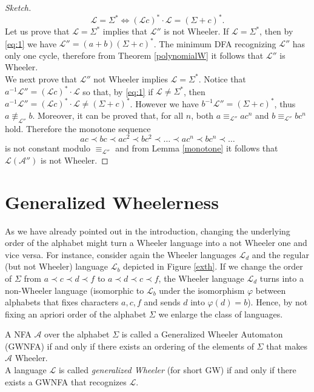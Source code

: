 \documentclass[runningheads]{llncs}
\newcommand{\la}[1]{\mathcal L(\mathcal #1)}
\begin{document}
\begin{proof}[Sketch]
\begin{equation}
\label{eq:1}
\mathcal L = \Sigma^* \iff (\mathcal Lc)^*\cdot\mathcal L = (\Sigma+c)^*.
\end{equation}
Let us prove that $\mathcal L = \Sigma^*$ implies that $\mathcal L''$ is not Wheeler. If $\mathcal L = \Sigma^*$, then by \eqref{eq:1} we have $\mathcal L'' = (a+b)(\Sigma+c)^*$. The minimum DFA recognizing $\mathcal L''$ has only one cycle, therefore from Theorem \ref{polynomialW} it follows that $\mathcal L''$ is Wheeler.\\
We next prove that $\mathcal L''$ not Wheeler implies $\mathcal L=\Sigma^*$. Notice that $a^{-1}\mathcal L''=(\mathcal Lc)^*\cdot\mathcal L $ so that,  by \eqref{eq:1}
if  $\mathcal L \ne \Sigma^*$, then $a^{-1}\mathcal L''=(\mathcal Lc)^*\cdot\mathcal L \ne (\Sigma+c)^*$. However we have $b^{-1}\mathcal L'' = (\Sigma+c)^*$, thus $a \not\equiv_\mathcal{L''} b$. Moreover, it can be proved that, for all $n$, both $a \equiv_\mathcal{L''} ac^n$ and $b \equiv_\mathcal{L''} bc^n$ hold. Therefore the monotone sequence 
\[
ac \prec bc \prec ac^2 \prec bc^2 \prec \dots \prec ac^n \prec bc^n \prec \dots
\]
is not constant modulo $\equiv_\mathcal{L''}$ and from Lemma \ref{monotone} it follows that $\la{A''}$ is not Wheeler.
\end{proof}


\section{Generalized Wheelerness}
\label{secGW}

As we have already pointed out in the introduction, changing the underlying order of the alphabet might turn a Wheeler language into a not Wheeler one and vice versa. For instance, consider again the Wheeler languages $\mathcal L_d$ and the regular (but not Wheeler) language $\mathcal L_b$ depicted in Figure \ref{exth}. 
If we change the order of $\Sigma$ from $a \prec c \prec d \prec f$ to $a \prec d \prec c \prec f$, the Wheeler language $\mathcal L_d$ turns into a non-Wheeler language (isomorphic to $\mathcal L_b$ under the isomorphism $\varphi$ between alphabets that fixes characters $a,c,f$ and sends $d$ into $\varphi(d) = b$). Hence, by not fixing  an apriori order of the alphabet $\Sigma$ we enlarge the class of languages.

\begin{definition}
\label{defGW}
A NFA $\mathcal A$ over the alphabet $\Sigma$ is called a Generalized Wheeler Automaton (GWNFA) if and only if there exists an ordering of the elements of $\Sigma$ that makes $\mathcal A$ Wheeler.
\\A language $\mathcal L$ is called \emph{generalized Wheeler} (for short GW) if and only if there exists a GWNFA that recognizes $\mathcal L$.
\end{definition}
\end{document}
